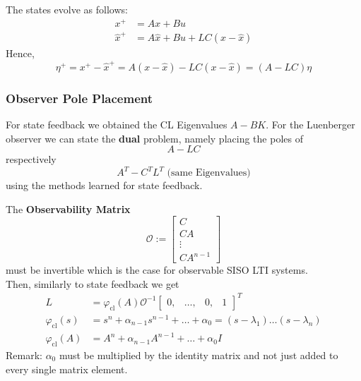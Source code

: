 The states evolve as follows:
\begin{align*}
    x^+       & =Ax+Bu                     \\
    \hat{x}^+ & =A\hat{x}+Bu+LC(x-\hat{x})
\end{align*}
Hence,
\begin{equation*}
    \eta^+=x^+-\hat{x}^+=A(x-\hat{x})-LC(x-\hat{x})=(A-LC)\eta
\end{equation*}

\subsubsection{Observer Pole Placement}
For state feedback we obtained the CL Eigenvalues $A-BK$. For the Luenberger observer we can state the \textbf{dual} problem, namely placing the poles of
\begin{equation*}
    A-LC
\end{equation*}
respectively
\begin{equation*}
    A^T-C^T L^T\text{ (same Eigenvalues)}
\end{equation*}
using the methods learned for state feedback.


The \textbf{Observability Matrix}
\begin{equation*}
    \mathcal{O}:=\begin{bmatrix}C\\CA\\\vdots\\CA^{n-1}\end{bmatrix}
\end{equation*}
must be invertible which is the case for observable SISO LTI systems.\\
Then, similarly to state feedback we get
\begin{align*}
    L                        & =\varphi_{\mathrm{cl}}(A)\mathcal{O}^{-1}\begin{bmatrix}0,&\ldots,&0,&1\end{bmatrix}^T \\
    \varphi_{\mathrm{cl}}(s) & =s^n+\alpha_{n-1}s^{n-1}+\ldots+\alpha_0=(s-\lambda_1)\ldots(s-\lambda_n)              \\
    \varphi_{\mathrm{cl}}(A) & =A^n+\alpha_{n-1}A^{n-1}+\ldots+\alpha_0I
\end{align*}
Remark: $\alpha_0$ must be multiplied by the identity matrix and not just added to every single matrix element.

